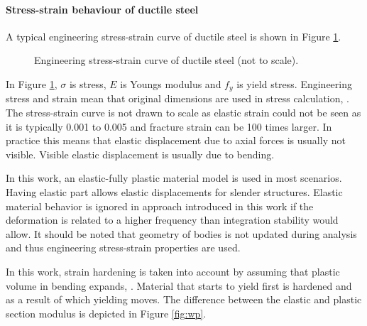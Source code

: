 \documentclass{jcgt}
\begin{document}
\paragraph{Stress-strain behaviour of ductile steel}
A typical engineering stress-strain curve of ductile steel is shown in Figure \ref{fig:sscurve}.

\begin{figure}
\centering
{}
\caption{Engineering stress-strain curve of ductile steel (not to scale).}
\label{fig:sscurve}
\end{figure}

In Figure \ref{fig:sscurve}, $\sigma$ is stress, $E$ is Youngs modulus and $f_y$ is yield stress.
Engineering stress and strain mean that original dimensions are used in stress calculation,
\cite{dowling}.
The stress-strain curve is not drawn to scale as elastic strain could not be seen as it is typically 
0.001 to 0.005 and fracture strain can be 100 times larger.
In practice this means that elastic displacement due to axial forces is usually not visible.
Visible elastic displacement is usually due to bending.

In this work, an elastic-fully plastic material model is used in most scenarios.
Having elastic part allows elastic displacements for slender structures. 
Elastic material behavior is ignored in approach introduced in this work if
the deformation is related to a higher frequency
than integration stability would allow.
It should be noted that geometry
of bodies is not updated during analysis and thus engineering stress-strain properties are used.

In this work, strain hardening is taken into account by assuming that plastic volume in bending
expands, 
\cite{dowling}.
Material that starts to yield first is hardened and as a result of which yielding moves.
%
The difference between the elastic and plastic section modulus is depicted in Figure \ref{fig:wp}.
\end{document}
